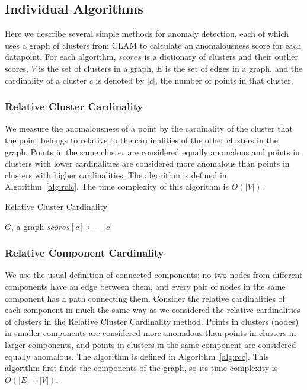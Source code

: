 \subsection{Individual Algorithms}
\label{subsec:methods:individual-algorithms}

Here we describe several simple methods for anomaly detection, each of which uses a graph of clusters from CLAM to calculate an anomalousness score for each datapoint.
For each algorithm, $scores$ is a dictionary of clusters and their outlier scores,
$V$ is the set of clusters in a graph,
$E$ is the set of edges in a graph, and
the cardinality of a cluster $c$ is denoted by $|c|$, the number of points in that cluster.

\subsubsection{Relative Cluster Cardinality}
We measure the anomalousness of a point by the cardinality of the cluster that the point belongs to relative to the cardinalities of the other clusters in the graph.
Points in the same cluster are considered equally anomalous and points in clusters with lower cardinalities are considered more anomalous than points in clusters with higher cardinalities. The algorithm is defined in Algorithm~\ref{alg:rclc}. The time complexity of this algorithm is $O(|V|)$.


\begin{algorithm}[h]
    \caption{Relative Cluster Cardinality}
    \label{alg:rclc}
\begin{algorithmic}[1]
    \REQUIRE $G$, a graph
    \STATE $scores[c] \gets -|c|$
    \ENDFOR
\end{algorithmic}
\end{algorithm}

\subsubsection{Relative Component Cardinality}
We use the usual definition of connected components: no two nodes from different components have an edge between them, and every pair of nodes in the same component has a path connecting them.
Consider the relative cardinalities of each component in much the same way as we considered the relative cardinalities of clusters in the Relative Cluster Cardinality method.
Points in clusters (nodes) in smaller components are considered more anomalous than points in clusters in larger components,
and points in clusters in the same component are considered equally anomalous.
The algorithm is defined in Algorithm~\ref{alg:rcc}.
This algorithm first finds the components of the graph, so its time complexity is $O(|E| + |V|)$.

